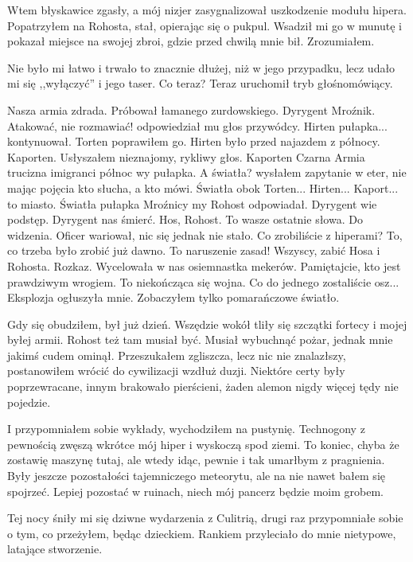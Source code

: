 Wtem błyskawice zgasły, a mój nizjer zasygnalizował uszkodzenie modułu hipera.
Popatrzyłem na Rohosta, stał, opierając się o pukpul.
Wsadził mi go w munutę i pokazał miejsce na swojej zbroi, gdzie przed chwilą mnie bił.
Zrozumiałem.

Nie było mi łatwo i trwało to znacznie dłużej, niż w jego przypadku, lecz udało mi się ,,wyłączyć'' i jego taser.
Co teraz?
Teraz uruchomił tryb głośnomówiący.
\begin{dialogue}
\ds{} Nasza armia zdrada. \dm{} Próbował łamanego zurdowskiego. \dm{} Dyrygent Mroźnik.
\ds{} Atakować, nie rozmawiać! \dm{} odpowiedział mu głos przywódcy.
\ds{} Hirten pułapka... \dm{} kontynuował.
\ds{} Torten \dm{} poprawiłem go. \dm{} Hirten było przed najazdem z północy.
\ds{} Kaporten. \dm{} Usłyszałem nieznajomy, rykliwy głos. \dm{} Kaporten Czarna Armia trucizna imigranci północ wy pułapka.
\ds{} A światła? \dm{} wysłałem zapytanie w eter, nie mając pojęcia kto słucha, a kto mówi. \dm{} Światła obok Torten... Hirten... Kaport... to miasto.
\ds{} Światła pułapka Mroźnicy my \dm{} Rohost odpowiadał. \dm{} Dyrygent wie podstęp. Dyrygent nas śmierć.
\ds{} Hos, Rohost. To wasze ostatnie słowa. Do widzenia. \dm{} Oficer wariował, nic się jednak nie stało. \dm{} Co zrobiliście z hiperami?
\ds{} To, co trzeba było zrobić już dawno.
\ds{} To naruszenie zasad! Wszyscy, zabić Hosa i Rohosta. Rozkaz. \dm{} Wycelowała w nas osiemnastka mekerów.
\ds{} Pamiętajcie, kto jest prawdziwym wrogiem. To niekończąca się wojna. Co do jednego zostaliście osz... \dm{} Eksplozja ogłuszyła mnie. Zobaczyłem tylko pomarańczowe światło.
\end{dialogue}

Gdy się obudziłem, był już dzień. Wszędzie wokół tliły się szczątki fortecy i mojej byłej armii.
Rohost też tam musiał być.
Musiał wybuchnąć pożar, jednak mnie jakimś cudem ominął.
Przeszukałem zgliszcza, lecz nic nie znalazłszy, postanowiłem wrócić do cywilizacji wzdłuż duzji. 
Niektóre certy były poprzewracane, innym brakowało pierścieni, żaden alemon nigdy więcej tędy nie pojedzie.

I przypomniałem sobie wykłady, wychodziłem na pustynię. Technogony z pewnością zwęszą wkrótce mój hiper i wyskoczą spod ziemi.
To koniec, chyba że zostawię maszynę tutaj, ale wtedy idąc, pewnie i tak umarłbym z pragnienia.
Były jeszcze pozostałości tajemniczego meteorytu, ale na nie nawet bałem się spojrzeć.
Lepiej pozostać w ruinach, niech mój pancerz będzie moim grobem.

Tej nocy śniły mi się dziwne wydarzenia z Culitrią, drugi raz przypomniałe sobie o tym, co przeżyłem, będąc dzieckiem.
Rankiem przyleciało do mnie nietypowe, latające stworzenie.

